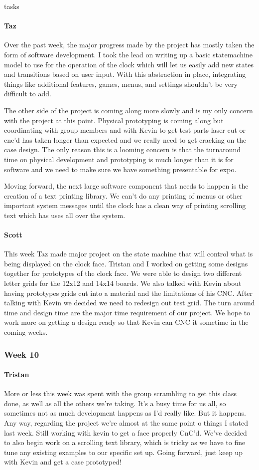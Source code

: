 tasks\documentclass[onecolumn, draftclsnofoot,10pt, compsoc]{IEEEtran}
\begin{document}
\paragraph{Taz}
Over the past week, the major progress made by the project has mostly taken the form of software development. I took the lead on writing up a basic statemachine model to use for the operation of the clock which will let us easily add new states and transitions based on user input. With this abstraction in place, integrating things like additional features, games, menus, and settings shouldn't be very difficult to add.

The other side of the project is coming along more slowly and is my only concern with the project at this point. Physical prototyping is coming along but coordinating with group members and with Kevin to get test parts laser cut or cnc'd has taken longer than expected and we really need to get cracking on the case design. The only reason this is a looming concern is that the turnaround time on physical development and prototyping is much longer than it is for software and we need to make sure we have something presentable for expo.

Moving forward, the next large software component that needs to happen is the creation of a text printing library. We can't do any printing of menus or other important system messages until the clock has a clean way of printing scrolling text which has uses all over the system.
\paragraph{Scott}
This week Taz made major project on the state machine that will control what is being displayed on the clock face. Tristan and I worked on getting some designs together for prototypes of the clock face. We were able to design two different letter grids for the 12x12 and 14x14 boards. We also talked with Kevin about having prototypes grids cut into a material and the limitations of his CNC. After talking with Kevin we decided we need to redesign out test grid. The turn around time and design time are the major time requirement of our project. We hope to work more on getting a design ready so that Kevin can CNC it sometime in the coming weeks.
\subsubsection{Week 10}
\paragraph{Tristan}
More or less this week was spent with the group scrambling to get this class done, as well as all the others we're taking. It's a busy time for us all, so sometimes not as much development happens as I'd really like. But it happens. Any way, regarding the project we're almost at the same point o things I stated last week. Still working with kevin to get a face properly CnC'd. We've decided to also begin work on a scrolling text library, which is tricky as we have to fine tune any existing examples to our specific set up. Going forward, just keep up with Kevin and get a case prototyped!
\end{document}

